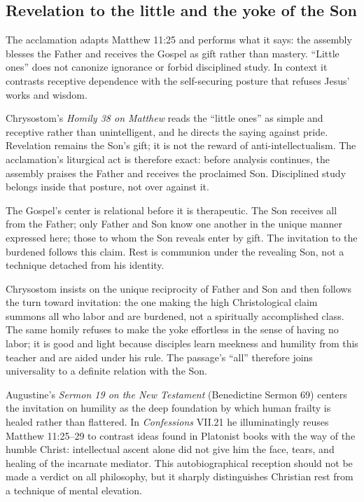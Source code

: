 \begin{deepstudy}
\subsection*{Revelation to the little and the yoke of the Son\enspace{}}

The acclamation adapts Matthew 11:25 and performs what it says: the assembly blesses the Father and receives the Gospel as gift rather than mastery. “Little ones” does not canonize ignorance or forbid disciplined study. In context it contrasts receptive dependence with the self-securing posture that refuses Jesus' works and wisdom.

Chrysostom's \emph{Homily 38 on Matthew} reads the “little ones” as simple and receptive rather than unintelligent, and he directs the saying against pride. Revelation remains the Son's gift; it is not the reward of anti-intellectualism. The acclamation's liturgical act is therefore exact: before analysis continues, the assembly praises the Father and receives the proclaimed Son. Disciplined study belongs inside that posture, not over against it.

The Gospel's center is relational before it is therapeutic. The Son receives all from the Father; only Father and Son know one another in the unique manner expressed here; those to whom the Son reveals enter by gift. The invitation to the burdened follows this claim. Rest is communion under the revealing Son, not a technique detached from his identity.

Chrysostom insists on the unique reciprocity of Father and Son and then follows the turn toward invitation: the one making the high Christological claim summons all who labor and are burdened, not a spiritually accomplished class. The same homily refuses to make the yoke effortless in the sense of having no labor; it is good and light because disciples learn meekness and humility from this teacher and are aided under his rule. The passage's “all” therefore joins universality to a definite relation with the Son.

Augustine's \emph{Sermon 19 on the New Testament} (Benedictine Sermon 69) centers the invitation on humility as the deep foundation by which human frailty is healed rather than flattered. In \emph{Confessions} VII.21 he illuminatingly reuses Matthew 11:25--29 to contrast ideas found in Platonist books with the way of the humble Christ: intellectual ascent alone did not give him the face, tears, and healing of the incarnate mediator. This autobiographical reception should not be made a verdict on all philosophy, but it sharply distinguishes Christian rest from a technique of mental elevation.


\end{deepstudy}
